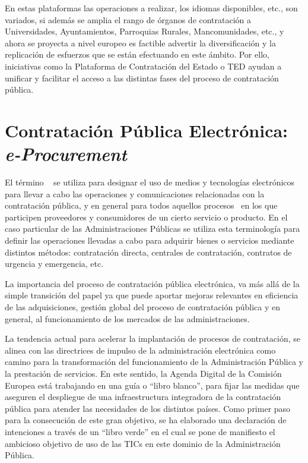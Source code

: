 En estas plataformas las operaciones a realizar, los idiomas disponibles, etc., son variados, si además se amplia el rango
de órganos de contratación a Universidades, Ayuntamientos, Parroquias Rurales, Mancomunidades, etc.,  y ahora se proyecta
a nivel europeo es factible advertir la diversificación y la replicación de esfuerzos que se están efectuando en este ámbito. 
Por ello, iniciativas como la Plataforma de Contratación del Estado o \gls{TED} ayudan a unificar y facilitar el acceso a las distintas fases del proceso
de contratación pública.

\section{Contratación Pública Electrónica: \textit{e-Procurement}}
El término \eproc~\cite{Podlogar2007} se utiliza para designar el uso de medios y tecnologías electrónicos para llevar a cabo
las operaciones y comunicaciones relacionadas con la contratación pública, y en general para todos aquellos procesos~\cite{DBLP:journals/tcci/Alor-HernandezAJPRMBG10}
en los que participen proveedores y consumidores de un cierto servicio o producto. En el caso particular de las Administraciones
Públicas se utiliza esta terminología para definir las operaciones llevadas a cabo para adquirir bienes o servicios mediante
distintos métodos: contratación directa, centrales de contratación, contratos de urgencia y emergencia, etc.

La importancia del proceso de contratación pública electrónica, va más allá de la simple transición del papel ya que puede
aportar mejoras relevantes en eficiencia de las adquisiciones, gestión global del proceso de contratación pública y en general, 
al funcionamiento de los mercados de las administraciones.

La tendencia actual para acelerar la implantación de procesos de contratación, se alinea con las directrices de impulso de la administración
electrónica como camino para la transformación del funcionamiento de la Administración Pública y la prestación de servicios. En este sentido,
la Agenda Digital de la Comisión Europea está trabajando en una guía o ``libro blanco'', para fijar las medidas que aseguren el despliegue
de una infraestructura integradora de la contratación pública para atender las necesidades de los distintos países. Como primer paso para la 
consecución de este gran objetivo, se ha elaborado una declaración de intenciones a través de un ``libro verde'' en el cual se pone de manifiesto el ambicioso objetivo
de uso de las TICs en este dominio de la Administración Pública. 

